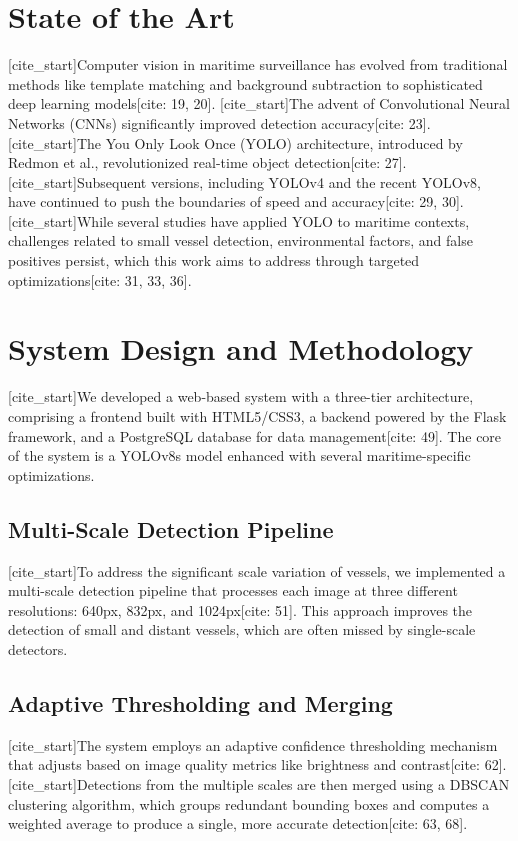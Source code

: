 \documentclass[10pt]{article}
\begin{document}
\section{State of the Art}
[cite_start]Computer vision in maritime surveillance has evolved from traditional methods like template matching and background subtraction to sophisticated deep learning models[cite: 19, 20]. [cite_start]The advent of Convolutional Neural Networks (CNNs) significantly improved detection accuracy[cite: 23]. [cite_start]The You Only Look Once (YOLO) architecture, introduced by Redmon et al., revolutionized real-time object detection[cite: 27]. [cite_start]Subsequent versions, including YOLOv4 and the recent YOLOv8, have continued to push the boundaries of speed and accuracy[cite: 29, 30]. [cite_start]While several studies have applied YOLO to maritime contexts, challenges related to small vessel detection, environmental factors, and false positives persist, which this work aims to address through targeted optimizations[cite: 31, 33, 36].

\section{System Design and Methodology}
[cite_start]We developed a web-based system with a three-tier architecture, comprising a frontend built with HTML5/CSS3, a backend powered by the Flask framework, and a PostgreSQL database for data management[cite: 49]. The core of the system is a YOLOv8s model enhanced with several maritime-specific optimizations.

\subsection{Multi-Scale Detection Pipeline}
[cite_start]To address the significant scale variation of vessels, we implemented a multi-scale detection pipeline that processes each image at three different resolutions: 640px, 832px, and 1024px[cite: 51]. This approach improves the detection of small and distant vessels, which are often missed by single-scale detectors.

\subsection{Adaptive Thresholding and Merging}
[cite_start]The system employs an adaptive confidence thresholding mechanism that adjusts based on image quality metrics like brightness and contrast[cite: 62]. [cite_start]Detections from the multiple scales are then merged using a DBSCAN clustering algorithm, which groups redundant bounding boxes and computes a weighted average to produce a single, more accurate detection[cite: 63, 68].
\end{document}
